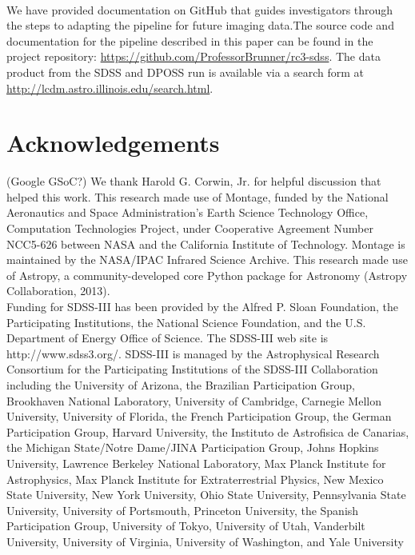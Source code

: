 \documentclass[5p]{elsarticle}
\begin{document}
\\
\indent We have provided documentation on GitHub  that guides investigators through the steps to adapting the pipeline for future imaging data.The source code and documentation for the pipeline described in this paper can be found in the project repository: \url{https://github.com/ProfessorBrunner/rc3-sdss}. The data product from the SDSS and DPOSS run is available via a search form at \url{http://lcdm.astro.illinois.edu/search.html}.

\section*{Acknowledgements}
\footnotesize
\indent (Google\/ GSoC?) We thank Harold G. Corwin, Jr. for helpful discussion that helped this work. This research made use of Montage, funded by the National Aeronautics and Space Administration's Earth Science Technology Office, Computation Technologies Project, under Cooperative Agreement Number NCC5-626 between NASA and the California Institute of Technology. Montage is maintained by the NASA/IPAC Infrared Science Archive. This research made use of Astropy, a community-developed core Python package for Astronomy (Astropy Collaboration, 2013).
\\
\indent  Funding for SDSS-III has been provided by the Alfred P. Sloan Foundation, the Participating Institutions, the National Science Foundation, and the U.S. Department of Energy Office of Science. The SDSS-III web site is http://www.sdss3.org/. SDSS-III is managed by the Astrophysical Research Consortium for the Participating Institutions of the SDSS-III Collaboration including the University of Arizona, the Brazilian Participation Group, Brookhaven National Laboratory, University of Cambridge, Carnegie Mellon University, University of Florida, the French Participation Group, the German Participation Group, Harvard University, the Instituto de Astrofisica de Canarias, the Michigan State/Notre Dame/JINA Participation Group, Johns Hopkins University, Lawrence Berkeley National Laboratory, Max Planck Institute for Astrophysics, Max Planck Institute for Extraterrestrial Physics, New Mexico State University, New York University, Ohio State University, Pennsylvania State University, University of Portsmouth, Princeton University, the Spanish Participation Group, University of Tokyo, University of Utah, Vanderbilt University, University of Virginia, University of Washington, and Yale University


 
\end{document}
